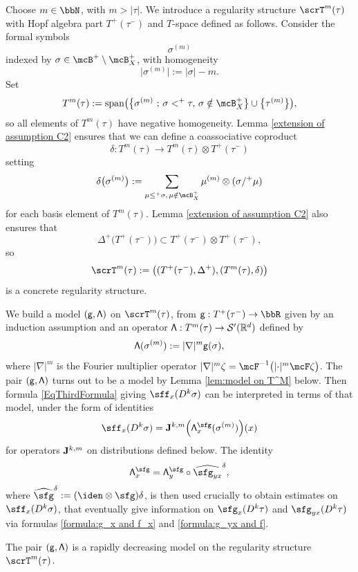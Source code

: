 Choose $m\in\bbN$, with $m>\vert\tau\vert$. We introduce a regularity structure $\scrT^m(\tau)$ with Hopf algebra part $T^+(\tau^-)$ and $T$-space defined as follows.
Consider the formal symbols
\[
\sigma^{(m)}
\]
indexed by $\sigma\in\mcB^+\setminus\mcB_X^+$, with homogeneity
\[
\big|\sigma^{(m)}\big| := |\sigma| - m.
\]
Set
\begin{align*}
T^m(\tau) := \textrm{span}
\bigl(\big\{\sigma^{(m)}\ ;\,\sigma<^+\tau,\, \sigma\notin\mcB_X^+\big\}
\cup\big\{\tau^{(m)}\big\}\bigr),
\end{align*}
so all elements of $T^m(\tau)$ have negative homogeneity.
Lemma \ref{extension of assumption C2} ensures that we can define a coassociative coproduct
\[
\delta: T^m(\tau)\to T^m(\tau)\otimes T^+(\tau^-)
\]
setting
\[
\delta\bigl(\sigma^{(m)}\bigr) := \sum_{\mu\leq^+\sigma,\,\mu\notin\mcB_X^+} \mu^{(m)}\otimes(\sigma/^+\mu)
\]
for each basis element of $T^m(\tau)$.
Lemma \ref{extension of assumption C2} also ensures that
\[
\Delta^+\bigl(T^+(\tau^-)\bigr) \subset T^+(\tau^-)\otimes T^+(\tau^-),
\]
so
\[
\scrT^m(\tau) := \bigl((T^+(\tau^-),\Delta^+), (T^m(\tau),\delta)\bigr)
\]
is a concrete regularity structure.

We build a model $\sf (g,\Lambda)$ on $\scrT^m(\tau)$, from ${\sf g} : T^+(\tau^-)\to\bbR$ given by an induction assumption and an operator ${\sf\Lambda}:T^m(\tau)\to\mathcal{S}'(\mathbb{R}^d)$ defined by
\[
{\sf\Lambda}(\sigma^{(m)}) := |\nabla|^m {\sf g}(\sigma),
\]
where $|\nabla|^m$ is the Fourier multiplier operator $|\nabla|^m\zeta = \mcF^{-1}\bigl(|{\cdot}|^m\mcF\zeta\bigr)$.
The pair $\sf(g,\Lambda)$ turns out to be a model by Lemma \ref{lem:model on T^M} below. Then formula \eqref{EqThirdFormula} giving $\sff_x(D^k\sigma)$ can be interpreted in terms of that model, under the form of identities
\[
\sff_x(D^k\sigma) = {\bf J}^{k,m}\Bigl({\sf \Lambda}^\sfg_x(\sigma^{(m)})\Bigr)(x)
\]
for operators ${\bf J}^{k,m}$ on distributions defined below. The identity
\[
{\sf \Lambda}^\sfg_x = {\sf \Lambda}^\sfg_y \circ\widehat{\sfg_{yx}}^\delta,
\]
where $\widehat{\sfg}^\delta := (\iden\otimes \sfg)\delta$, is then used crucially to obtain estimates on $\sff_x(D^k\sigma)$, that eventually give information on $\sfg_x(D^k\tau)$ and $\sfg_{yx}(D^k\tau)$ via formulas \eqref{formula:g_x and f_x} and \eqref{formula:g_yx and f}.

\begin{lem}\label{lem:model on T^M}
The pair $({\sf g},{\sf\Lambda})$ is a rapidly decreasing model on the regularity structure $\scrT^m(\tau)$.
\end{lem}

